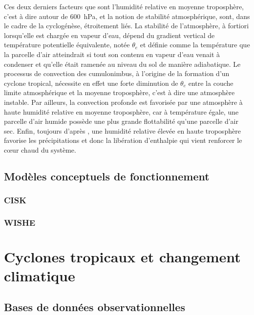 \documentclass[../main.tex]{subfiles}
\begin{document}
Ces deux derniers facteurs que sont l'humidité relative en moyenne troposphère, c'est à dire autour de \SI{600}{\hecto\pascal}, et la notion de stabilité atmosphérique, sont, dans le cadre de la cyclogénèse, étroitement liés. La stabilité de l'atmosphère, à fortiori lorsqu'elle est chargée en vapeur d'eau, dépend du gradient vertical de température potentielle équivalente, notée $\theta_e$ et définie comme la température que la parcelle d'air atteindrait si tout son contenu en vapeur d'eau
venait à condenser et qu'elle était ramenée au niveau du sol de manière adiabatique. Le processus de convection des cumulonimbus, à l'origine de la formation d'un cyclone tropical, nécessite en effet une forte diminution de $\theta_e$ entre la couche limite atmosphérique et la moyenne troposphère, c'est à dire une atmosphère instable. Par ailleurs, la convection profonde est favorisée par une atmosphère à haute humidité relative en moyenne troposphère, car à température égale, une
parcelle d'air humide possède une plus grande flottabilité qu'une parcelle d'air sec. Enfin, toujours d'après \cite{gray_tropical_1975}, une humidité relative élevée en haute troposphère favorise les précipitations et donc la libération d'enthalpie qui vient renforcer le cœur chaud du système.

\subsection{Modèles conceptuels de fonctionnement}

\subsubsection{CISK}

\cite{charney_growth_1964,ooyama_dynamical_1964,ooyama_numerical_1969}

\subsubsection{WISHE}

\cite{emanuel_airsea_1986,emanuel_largescale_1994}

\section{Cyclones tropicaux et changement climatique}

\subsection{Bases de données observationnelles}
\end{document}
